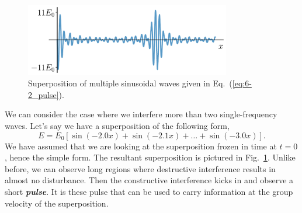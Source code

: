 




\begin{figure}[t]
   \centering
    \includegraphics[width=0.8\textwidth]{lesson6/6-2_superpostion_many.pdf}    
        \caption[Pulse]{Superposition of multiple sinusoidal waves given in Eq.~(\ref{eq:6-2_pulse}).}
        \label{fig:6-2_pulse}
\end{figure}
We can consider the case where we interfere more than two single-frequency waves.
Let's say we have a superposition of the following form,
\begin{equation}
    E = E_0 [\sin(-2.0x) + \sin(-2.1x) + \ldots + \sin(-3.0x)].
    \label{eq:6-2_pulse}
\end{equation}
We have assumed that we are looking at the superposition frozen in time at $t=0$, hence the simple form.
The resultant superposition is pictured in Fig.~\ref{fig:6-2_pulse}.
Unlike before, we can observe long regions where destructive interference results in almost no disturbance.
Then the constructive interference kicks in and observe a short \textit{\textbf{pulse}}.
It is these pulse that can be used to carry information at the group velocity of the superposition.



